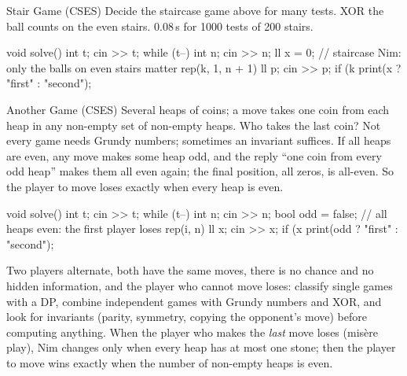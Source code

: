 \begin{problem}{Stair Game (CSES)}
Decide the staircase game above for many tests.
\solution XOR the ball counts on the even stairs. 0.08\,s for 1000 tests of 200 stairs.
\end{problem}

\begin{code}
void solve() {
    int t;
    cin >> t;
    while (t--) {
        int n;
        cin >> n;
        ll x = 0;  // staircase Nim: only the balls on even stairs matter
        rep(k, 1, n + 1) {
            ll p;
            cin >> p;
            if (k %
        }
        print(x ? "first" : "second");
    }
}
\end{code}

\begin{problem}{Another Game (CSES)}
Several heaps of coins; a move takes one coin from each heap in any non-empty set of non-empty heaps. Who takes the last coin?
\solution Not every game needs Grundy numbers; sometimes an invariant suffices. If all heaps are even, any move makes some heap odd,
and the reply ``one coin from every odd heap'' makes them all even again; the final position, all zeros, is all-even. So the player to
move loses exactly when every heap is even.
\end{problem}

\begin{code}
void solve() {
    int t;
    cin >> t;
    while (t--) {
        int n;
        cin >> n;
        bool odd = false;  // all heaps even: the first player loses
        rep(i, n) {
            ll x;
            cin >> x;
            if (x %
        }
        print(odd ? "first" : "second");
    }
}
\end{code}

\begin{recognize}
Two players alternate, both have the same moves, there is no chance and no hidden information, and the player who cannot move loses:
classify single games with a DP, combine independent games with Grundy numbers and XOR, and look for invariants (parity, symmetry,
copying the opponent's move) before computing anything. When the player who makes the \emph{last} move loses (mis\`ere play), Nim
changes only when every heap has at most one stone; then the player to move wins exactly when the number of non-empty heaps is even.
\end{recognize}

